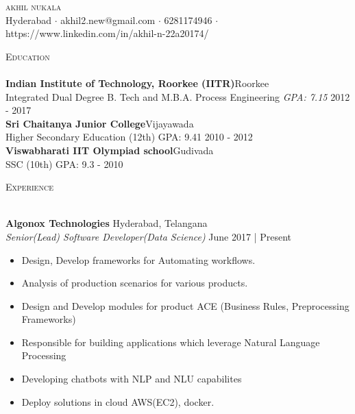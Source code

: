 \documentclass[a4paper]{article}
\newcommand{\lineunder} {
    \vspace*{-8pt} \\
    \hspace*{-18pt} \hrulefill \\
}
\newcommand{\header} [1] {
    {\hspace*{-18pt}\vspace*{6pt} \textsc{#1}}
    \vspace*{-6pt} \lineunder
}
\begin{document}
\vspace*{-40pt}

\vspace*{-10pt}
\begin{center}
	{\Huge \scshape {akhil nukala}}\\
	Hyderabad $\cdot$ akhil2.new@gmail.com $\cdot$ 6281174946 $\cdot$ https://www.linkedin.com/in/akhil-n-22a20174/\\
\end{center}

\header{Education}
\textbf{Indian Institute of Technology, Roorkee (IITR)}\hfill Roorkee\\
Integrated Dual Degree B. Tech and M.B.A. Process Engineering \textit{GPA: 7.15} \hfill 2012 - 2017\\
\vspace{2mm}
\textbf{Sri Chaitanya Junior College}\hfill Vijayawada\\
Higher Secondary Education (12th) GPA: 9.41 \hfill 2010 - 2012\\
\vspace{2mm}
\textbf{Viswabharati IIT Olympiad school}\hfill Gudivada\\
SSC (10th) GPA: 9.3 \hfill  - 2010\\
\vspace{2mm}

\header{Experience}
\vspace{1mm}

\textbf{Algonox Technologies} \hfill Hyderabad, Telangana\\
\textit{Senior(Lead) Software Developer(Data Science)} \hfill June 2017 | Present\\
\vspace{-1mm}
\begin{itemize} \itemsep 1pt
    \item Design, Develop frameworks for Automating workflows.
    \item Analysis of production scenarios for various products.
	\item Design and Develop modules for product ACE (Business Rules, Preprocessing Frameworks)
	\item Responsible for building applications which leverage Natural Language Processing
    \item Developing chatbots with NLP and NLU capabilites
    \item Deploy solutions in cloud AWS(EC2), docker.
\end{itemize}
\end{document}
